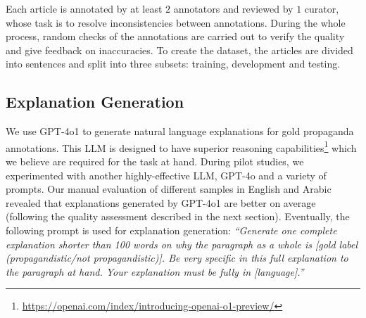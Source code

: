 Each article is annotated by at least $2$ annotators and reviewed by $1$ curator, whose task is to resolve inconsistencies between annotations.
During the whole process, random checks of the annotations are carried out to verify the quality and give feedback on inaccuracies.
To create the dataset, the articles are divided into sentences and split into three subsets: training, development and testing.

\subsection{Explanation Generation}
We use GPT-4o1 to generate natural language explanations for gold propaganda annotations. This LLM is designed to have superior reasoning capabilities\footnote{\url{https://openai.com/index/introducing-openai-o1-preview/}} which we believe are required for the task at hand. During pilot studies, we experimented with another highly-effective LLM, GPT-4o and a variety of prompts. Our manual evaluation of different samples in English and Arabic %
revealed that explanations generated by GPT-4o1 are better on average (following the quality assessment described in the next section). Eventually, the following prompt is used for explanation generation: \textit{``Generate one complete explanation shorter than 100 words on why the paragraph as a whole is [gold label (propagandistic/not propagandistic)]. Be very specific in this full explanation to the paragraph at hand. Your explanation must be fully in [language].''}


